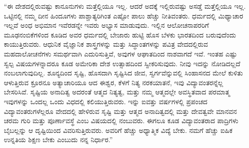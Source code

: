  “ಈ ದೇಶದಲ್ಲಿರುವಷ್ಟು ಕಾನೂನುಗಳು ಮತ್ತೆಲ್ಲಿಯೂ ಇಲ್ಲ. ಆದರೆ ಅದಕ್ಕೆ ಇಲ್ಲಿರುವಷ್ಟು ಅಸಡ್ಡೆ ಮತ್ತೆಲ್ಲಿಯೂ ಇಲ್ಲ. ಒಟ್ಟಿನಲ್ಲಿ ನಮ್ಮ ದೀನ ಹಿಂದೂಗಳು ಪಾಶ್ಚಾತ್ಯರಿಗಿಂತ ಎಷ್ಟೋ ಪಾಲು ಹೆಚ್ಚು ನೀತಿವಂತರು. ಧರ್ಮದಲ್ಲಿ ಮಿಥ್ಯಾಚಾರ ಇಲ್ಲವೆ ಅಂಧ ಅಭಿಮಾನ ಇವೆರಡನ್ನೇ ಇವರು ಅಭ್ಯಾಸ ಮಾಡುವುದು. ಇಲ್ಲಿನ ಆಲೋಚನಾಪರರಿಗೆ ಮೂಢನಂಬಿಕೆಗಳಿಂದ ಕೂಡಿದ ಅವರ ಧರ್ಮದಲ್ಲಿ ಬೇಜಾರು ಹುಟ್ಟಿ ಹೊಸ ಬೆಳಕು ಭಾರತದಿಂದ ಬರುವುದೆಂದು ಕಾಯುತ್ತಿರುವರು. ಆಧುನಿಕ ವೈಜ್ಞಾನಿಕ ಶಾಸ್ತ್ರಗಳನ್ನು ಮತ್ತು ಸಿದ್ಧಾಂತಗಳನ್ನು ಪವಿತ್ರ ವೇದದಲ್ಲಿರುವ ಮಹದಾಲೋಚನೆಗಳು ಸಮರ್ಥವಾಗಿ ಎದುರಿಸುತ್ತಿವೆ, ಅವುಗಳ ಆಘಾತದಿಂದ ನಾಶವಾಗದೆ ಇವೆ. ಇಂತಹ ಎಷ್ಟು ಸ್ವಲ್ಪ ವಿಷಯಗಳನ್ನಾದರೂ ಕೂಡ ಅಮೇರಿಕಾ ದೇಶ ಉತ್ಸಾಹದಿಂದ ಸ್ವೀಕರಿಸುವುದು. ನೀವು ಇದನ್ನು ನೋಡಿದಲ್ಲದೆ ನಂಬಲಾಗುವುದಿಲ್ಲ. ಶೂನ್ಯದಿಂದ ಸೃಷ್ಟಿ, ಹೊಸದಾಗಿ ಸೃಷ್ಟಿಸಿದ ಜೀವ, ಸ್ವರ್ಗವೆನ್ನುವಲ್ಲಿ ಸಿಂಹಾಸನದ ಮೇಲೆ ಕುಳಿತು ಆಳುತ್ತಿರುವ ಕ್ರೂರನೂ ಅತ್ಯಾಚಾರಿಯೂ ಆದ ಈಶ್ವರ, ಕೆಳಗೆ ನಿತ್ಯ ನರಕಯಾತನೆ, ಇವು ವಿದ್ಯಾವಂತರನ್ನೆಲ್ಲ ಬೇಸರಿಸಿವೆ. ಸೃಷ್ಟಿಯ ಅನಾದಿತ್ವ ಅದರಂತೆ ಆತ್ಮದ ನಿತ್ಯತ್ವ, ಮತ್ತು ನಮ್ಮ ಆತ್ಮದಲ್ಲೇ ಅವಸ್ಥಿತವಾದ ಪರಮಾತ್ಮ ಇವುಗಳನ್ನು ಒಂದಲ್ಲ ಒಂದು ವಿಧದಲ್ಲಿ ಕಲಿಯುತ್ತಿರುವರು. ಇನ್ನು ಐವತ್ತು ವರ್ಷಗಳಲ್ಲಿ ಪ್ರಪಂಚದ ವಿದ್ಯಾವಂತರುಗಳೆಲ್ಲರೂ ವೇದದಲ್ಲಿ ಹೇಳಿರುವ ಸೃಷ್ಟಿ ಮತ್ತು ಆತ್ಮದ ಅನಾದಿತ್ವದಲ್ಲಿ ಮತ್ತು ದೇವತ್ವವೇ ಮಾನವನ ಚರಮ ಗುರಿ ಮತ್ತು ಪೂರ್ಣಾವಸ್ಥೆ ಎಂಬ ವಿಷಯದಲ್ಲಿ ನಂಬುವರು. ಈಗಲೂ ಕೂಡ ವಿದ್ಯಾವಂತರಾದ ಪಾದ್ರಿಗಳು ಬೈಬಲ್ಲನ್ನು ಆ ದೃಷ್ಟಿಯಿಂದ ವಿವರಿಸುತ್ತಿರುವರು. ಅವರಿಗೆ ಹೆಚ್ಚು ಅಧ್ಯಾತ್ಮಿಕ ವಿದ್ಯೆ ಬೇಕು. ನಮಗೆ ಹೆಚ್ಚು ಐಹಿಕ ಉನ್ನತಿಯ ಶಿಕ್ಷಣ ಬೇಕು ಎಂಬುದು ನನ್ನ ನಿರ್ಧಾರ.” 

